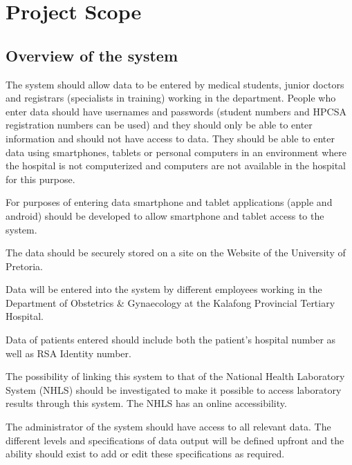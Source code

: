 \section{Project Scope}

\subsection{Overview of the system} 
The system should allow data to be entered by medical students, junior doctors 
and  registrars  (specialists  in  training)  working  in  the  department.  People  who 
enter  data  should  have  usernames  and  passwords  (student  numbers  and 
HPCSA registration numbers can be used) and they should only be able to enter 
information  and  should  not  have  access  to  data.  They  should  be  able  to  enter 
data using smartphones, tablets or personal computers in an environment where 
the hospital is not computerized and computers are not available in the hospital 
for this purpose. \par 

For purposes  of  entering  data  smartphone and  tablet applications (apple  and 
android)  should be  developed  to  allow  smartphone  and  tablet  access  to  the 
system. \par

The data should be securely stored on a site on the Website of the University of 
Pretoria. \par

Data  will  be  entered  into  the  system  by  different  employees  working  in  the 
Department  of  Obstetrics  \&  Gynaecology  at  the  Kalafong  Provincial  Tertiary 
Hospital. \par

Data of patients entered should include both the patient's hospital number as well 
as RSA Identity number. \par

The  possibility  of  linking  this  system  to  that  of  the  National  Health  Laboratory 
System (NHLS) should be investigated to make it possible to access laboratory 
results through this system. The NHLS has an online accessibility. \par

The  administrator  of  the  system  should  have  access  to  all  relevant  data.  The 
different levels and specifications of data output will be defined upfront and the 
ability should exist to add or edit these specifications as required. \par

